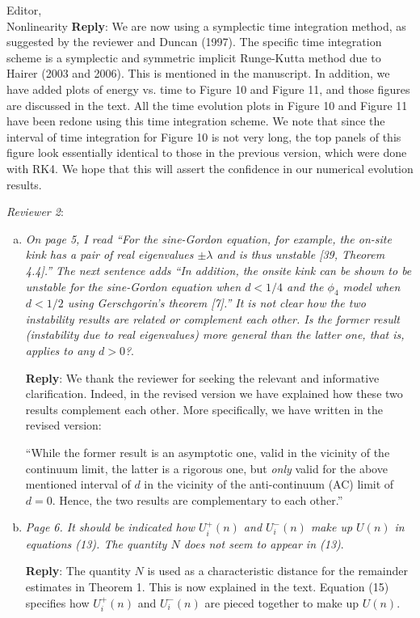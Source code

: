 \documentclass[11pt]{letter}
\begin{document}
\begin{letter}{Editor, \\
Nonlinearity}
{\bf Reply}: We are now using a symplectic time integration method, as suggested by the reviewer and Duncan (1997). The specific time integration scheme is a symplectic and symmetric implicit Runge-Kutta method due to Hairer (2003 and 2006). This is mentioned in the manuscript. In addition, we have added plots of energy vs. time to Figure 10 and Figure 11, and those figures are discussed in the text. All the time evolution plots in Figure 10 and Figure 11 have been redone using this time integration scheme. We note that since the interval of time integration for Figure 10 is not very long, the top panels of this figure look essentially identical to those in the previous version, which were done with RK4. We hope that this will assert the confidence in our numerical evolution results. 

{\it Reviewer 2}:
\begin{enumerate}[(a)]
\item \emph{On page 5, I read ``For the sine-Gordon equation, for example, the on-site kink has a pair of real eigenvalues $\pm \lambda$ and is thus unstable [39, Theorem 4.4].'' The next sentence adds ``In addition, the onsite kink can be shown to be unstable for the sine-Gordon equation when $d < 1/4$ and the $\phi_4$ model when $d < 1/2$ using Gerschgorin’s theorem [7].'' It is not clear how the two instability results are related or complement each other. Is the former result (instability due to real eigenvalues) more general than the latter one, that is, applies to any $d > 0$?}. 

{\bf Reply}: We thank the reviewer for seeking the relevant
and informative clarification. Indeed, in the revised version
we have explained how these two results complement each other.
More specifically, we have written in the revised version:

``While the former result is an asymptotic one, valid
in the vicinity of the continuum limit, the latter is a
rigorous one, but {\it only} valid for the above mentioned
interval of $d$ in the vicinity of the anti-continuum (AC) limit
of $d=0$. Hence, the two results are complementary to each other.''


\item \emph{Page 6. It should be indicated how $U_i^+(n)$ and $U_i^-(n)$ make up $U(n)$ in equations (13). The quantity $N$ does not seem to appear in (13)}. 


{\bf Reply}: The quantity $N$ is used as a characteristic distance for the remainder estimates in Theorem 1. This is now explained in the text. Equation (15) specifies how $U_i^+(n)$ and $U_i^-(n)$ are pieced together to make up $U(n)$.


\end{enumerate}
\end{letter}
\end{document}
